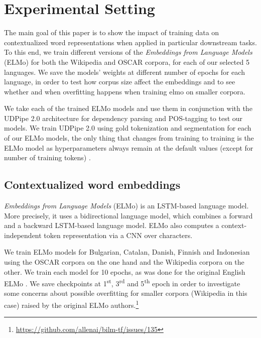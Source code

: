 \section{Experimental Setting}

The main goal of this paper is to show the impact of training data on contextualized word representations when applied in particular downstream tasks. To this end, we train different versions of the \emph{Embeddings from Language Models} (ELMo) \citep{peters-etal-2018-deep} for both the Wikipedia and OSCAR corpora, for each of our selected 5 languages. We save the models' weights at different number of epochs for each language, in order to test how corpus size affect the embeddings and to see whether and when overfitting happens when training elmo on smaller corpora.

We take each of the trained ELMo models and use them in conjunction with the UDPipe 2.0 \citep{straka-2018-udpipe,straka-strakova-2019-evaluating} architecture for dependency parsing and POS-tagging to test our models. We train UDPipe 2.0 using gold tokenization and segmentation for each of our ELMo models, the only thing that changes from training to training is the ELMo model as hyperparameters always remain at the default values (except for number of training tokens) \citep{peters-etal-2018-deep}.

\subsection{Contextualized word embeddings}

\emph{Embeddings from Language Models} (ELMo) \citep{peters-etal-2018-deep} is an LSTM-based language model. More precisely, it uses a bidirectional language model, which combines a forward and a backward LSTM-based language model. ELMo also computes a context-independent token representation via a CNN over characters.

We train ELMo models for Bulgarian, Catalan, Danish, Finnish and Indonesian using the OSCAR corpora on the one hand and the Wikipedia corpora on the other. We train each model for 10 epochs, as was done for the original English ELMo \citep{peters-etal-2018-deep}. We save checkpoints at 1\textsuperscript{st}, 3\textsuperscript{rd} and 5\textsuperscript{th} epoch in order to investigate some concerns about possible overfitting for smaller corpora (Wikipedia in this case) raised by the original ELMo authors.\footnote{\url{https://github.com/allenai/bilm-tf/issues/135}}

